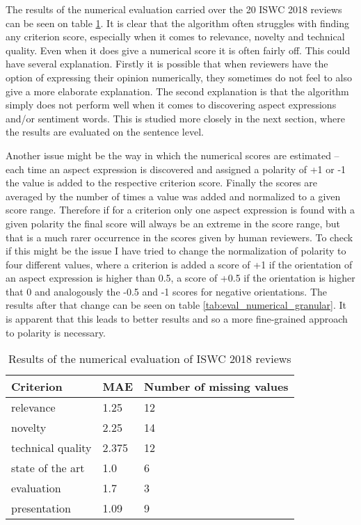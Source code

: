 The results of the numerical evaluation carried over the 20 ISWC 2018 reviews can be seen on table \ref{tab:eval_numerical}. It is clear that the algorithm often struggles with finding any criterion score, especially when it comes to relevance, novelty and technical quality. Even when it does give a numerical score it is often fairly off. This could have several explanation. Firstly it is possible that when reviewers have the option of expressing their opinion numerically, they sometimes do not feel to also give a more elaborate explanation. The second explanation is that the algorithm simply does not perform well when it comes to discovering aspect expressions and/or sentiment words. This is studied more closely in the next section, where the results are evaluated on the sentence level. 

Another issue might be the way in which the numerical scores are estimated -- each time an aspect expression is discovered and assigned a polarity of +1 or -1 the value is added to the respective criterion score. Finally the scores are averaged by the number of times a value was added and normalized to a given score range. Therefore if for a criterion only one aspect expression is found with a given polarity the final score will always be an extreme in the score range, but that is a much rarer occurrence in the scores given by human reviewers. To check if this might be the issue I have tried to change the normalization of polarity to four different values, where a criterion is added a score of +1 if the orientation of an aspect expression is higher than 0.5, a score of +0.5 if the orientation is higher that 0 and analogously the -0.5 and -1 scores for negative orientations. The results after that change can be seen on table \ref{tab:eval_numerical_granular}. It is apparent that this leads to better results and so a more fine-grained approach to polarity is necessary.

\begin{table}[!htb]
\caption{Results of the numerical evaluation of ISWC 2018 reviews}
\label{tab:eval_numerical}
\centering
\begin{tabular}{l|l|l}
\textbf{Criterion} & \textbf{MAE} & \textbf{Number of missing values} \\ \hline
relevance          & 1.25         & 12                                \\
novelty            & 2.25          & 14                                \\
technical quality  & 2.375         & 12                                \\
state of the art   & 1.0          & 6                                 \\
evaluation         & 1.7          & 3                                 \\
presentation       & 1.09          & 9                                
\end{tabular}
\end{table}

